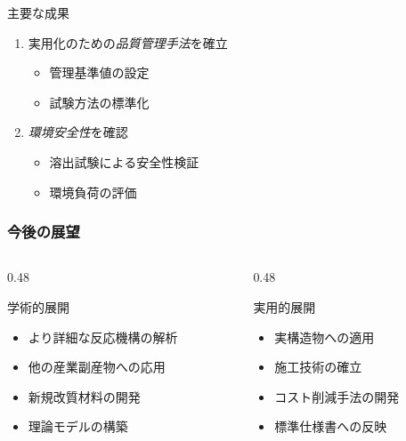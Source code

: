 \documentclass[unicode, 9pt, aspectratio=43]{beamer}
\begin{document}
\begin{refsection}
\begin{frame}
\begin{center}
\begin{minipage}{0.85\linewidth}
\begin{block}{主要な成果}
\begin{enumerate}
            \item 実用化のための\emph{品質管理手法}を確立
              \begin{itemize}
                \item 管理基準値の設定
                \item 試験方法の標準化
              \end{itemize}

            \item \emph{環境安全性}を確認
              \begin{itemize}
                \item 溶出試験による安全性検証
                \item 環境負荷の評価
              \end{itemize}
          \end{enumerate}
        \end{block}
      \end{minipage}
    \end{center}
  \end{frame}

  \begin{frame}
    \frametitle{今後の展望}
    \begin{columns}
      \begin{column}{0.48\linewidth}
        \begin{alertblock}{学術的展開}
          \begin{itemize}
            \item より詳細な反応機構の解析
            \item 他の産業副産物への応用
            \item 新規改質材料の開発
            \item 理論モデルの構築
          \end{itemize}
        \end{alertblock}
      \end{column}

      \begin{column}{0.48\linewidth}
        \begin{exampleblock}{実用的展開}
          \begin{itemize}
            \item 実構造物への適用
            \item 施工技術の確立
            \item コスト削減手法の開発
            \item 標準仕様書への反映
          \end{itemize}
        \end{exampleblock}
      \end{column}
    \end{columns}


\end{frame}
\end{refsection}
\end{document}
